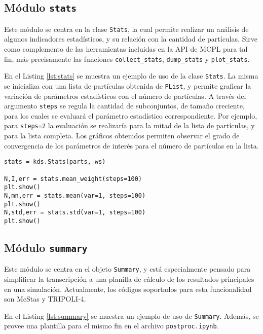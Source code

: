 \subsection{Módulo \texttt{stats}}

Este módulo se centra en la clase \verb|Stats|, la cual permite realizar un análisis de algunos indicadores estadísticos, y su relación con la cantidad de partículas. Sirve como complemento de las herramientas incluidas en la API de MCPL para tal fin, más precisamente las funciones \verb|collect_stats|, \verb|dump_stats| y \verb|plot_stats|.

En el Listing \ref{lst:stats} se muestra un ejemplo de uso de la clase \verb|Stats|. La misma se inicializa con una lista de partículas obtenida de \verb|PList|, y permite graficar la variación de parámetros estadísticos con el número de partículas. A través del argumento \verb|steps| se regula la cantidad de subconjuntos, de tamaño creciente, para los cuales se evaluará el parámetro estadístico correspondiente. Por ejemplo, para \verb|steps=2| la evaluación se realizaría para la mitad de la lista de partículas, y para la lista completa. Los gráficos obtenidos permiten observar el grado de convergencia de los parámetros de interés para el número de partículas en la lista.

\begin{lstlisting}[language=Python2, label={lst:stats}, caption=Ejemplo de uso de \texttt{Stats}.]
stats = kds.Stats(parts, ws)

N,I,err = stats.mean_weight(steps=100)
plt.show()
N,mn,err = stats.mean(var=1, steps=100)
plt.show()
N,std,err = stats.std(var=1, steps=100)
plt.show()
\end{lstlisting}


\subsection{Módulo \texttt{summary}}

Este módulo se centra en el objeto \verb|Summary|, y está especialmente pensado para simplificar la transcripción a una planilla de cálculo de los resultados principales en una simulación. Actualmente, los códigos soportados para esta funcionalidad son McStas y TRIPOLI-4.

En el Listing \ref{lst:summary} se muestra un ejemplo de uso de \verb|Summary|. Además, se provee una plantilla para el mismo fin en el archivo \verb|postproc.ipynb|.

